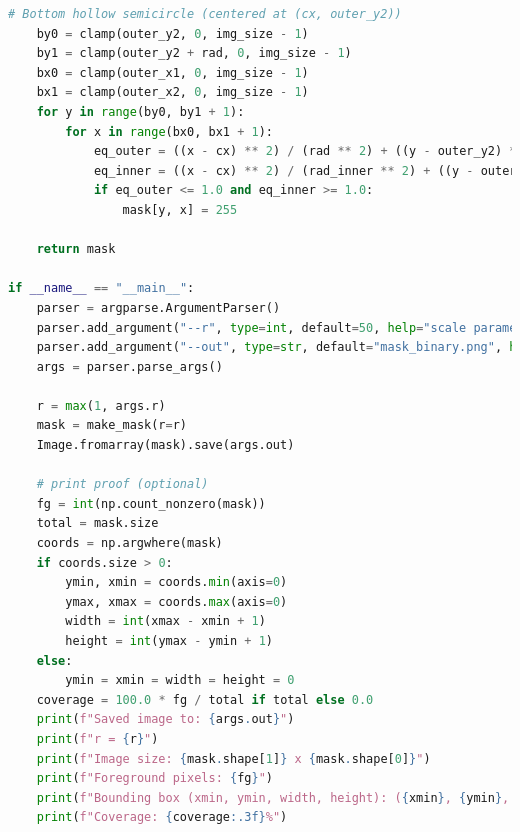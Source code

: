 \documentclass[11pt,a4paper]{article}
\begin{document}
\begin{lstlisting}[language=Python, caption=make mask.py]
    # Bottom hollow semicircle (centered at (cx, outer_y2))
    by0 = clamp(outer_y2, 0, img_size - 1)
    by1 = clamp(outer_y2 + rad, 0, img_size - 1)
    bx0 = clamp(outer_x1, 0, img_size - 1)
    bx1 = clamp(outer_x2, 0, img_size - 1)
    for y in range(by0, by1 + 1):
        for x in range(bx0, bx1 + 1):
            eq_outer = ((x - cx) ** 2) / (rad ** 2) + ((y - outer_y2) ** 2) / (rad ** 2)
            eq_inner = ((x - cx) ** 2) / (rad_inner ** 2) + ((y - outer_y2) ** 2) / (rad_inner ** 2)
            if eq_outer <= 1.0 and eq_inner >= 1.0:
                mask[y, x] = 255

    return mask

if __name__ == "__main__":
    parser = argparse.ArgumentParser()
    parser.add_argument("--r", type=int, default=50, help="scale parameter r")
    parser.add_argument("--out", type=str, default="mask_binary.png", help="output filename")
    args = parser.parse_args()

    r = max(1, args.r)
    mask = make_mask(r=r)
    Image.fromarray(mask).save(args.out)

    # print proof (optional)
    fg = int(np.count_nonzero(mask))
    total = mask.size
    coords = np.argwhere(mask)
    if coords.size > 0:
        ymin, xmin = coords.min(axis=0)
        ymax, xmax = coords.max(axis=0)
        width = int(xmax - xmin + 1)
        height = int(ymax - ymin + 1)
    else:
        ymin = xmin = width = height = 0
    coverage = 100.0 * fg / total if total else 0.0
    print(f"Saved image to: {args.out}")
    print(f"r = {r}")
    print(f"Image size: {mask.shape[1]} x {mask.shape[0]}")
    print(f"Foreground pixels: {fg}")
    print(f"Bounding box (xmin, ymin, width, height): ({xmin}, {ymin}, {width}, {height})")
    print(f"Coverage: {coverage:.3f}%")
\end{lstlisting}
\end{document}
